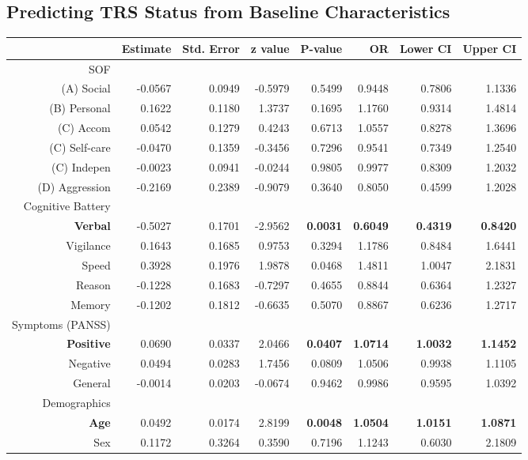\documentclass[a4paper,nobib]{article}
\begin{document}
\subsection*{Predicting TRS Status from Baseline Characteristics}
\begin{table}[!hbtp]
\begin{center}
	\begin{normalsize}
		\begin{tabular}{rrrrrrrr}
\hline
	&Estimate&Std. Error&z value&P-value&OR&Lower CI & Upper CI\\ 
\hline
SOF\\
\hline
(A) Social &-0.0567&0.0949&-0.5979&0.5499&0.9448&0.7806&1.1336\\ 
(B) Personal &0.1622&0.1180&1.3737&0.1695&1.1760&0.9314&1.4814\\ 
(C) Accom &0.0542&0.1279&0.4243&0.6713&1.0557&0.8278&1.3696\\ 
(C) Self-care&-0.0470&0.1359&-0.3456&0.7296&0.9541&0.7349&1.2540\\ 
(C) Indepen &-0.0023&0.0941&-0.0244&0.9805&0.9977&0.8309&1.2032\\ 
(D) Aggression &-0.2169&0.2389&-0.9079&0.3640&0.8050&0.4599&1.2028\\   
\hline
Cognitive Battery\\
\hline
\textbf{Verbal} &-0.5027&0.1701&-2.9562& \textbf{0.0031} & \textbf{0.6049} & \textbf{0.4319} & \textbf{0.8420} \\ 
Vigilance &0.1643&0.1685&0.9753&0.3294&1.1786&0.8484&1.6441\\ 
Speed &0.3928&0.1976&1.9878&0.0468&1.4811&1.0047&2.1831\\ 
Reason &-0.1228&0.1683&-0.7297&0.4655&0.8844&0.6364&1.2327\\ 
Memory &-0.1202&0.1812&-0.6635&0.5070&0.8867&0.6236&1.2717\\  
\hline
Symptoms (PANSS)\\
\hline
\textbf{Positive} &0.0690&0.0337&2.0466& \textbf{0.0407} & \textbf{1.0714} & \textbf{1.0032} & \textbf{1.1452} \\ 
Negative &0.0494&0.0283&1.7456&0.0809&1.0506&0.9938&1.1105\\ 
General &-0.0014&0.0203&-0.0674&0.9462&0.9986&0.9595&1.0392\\  
\hline
Demographics\\
\hline
\textbf{Age} &0.0492&0.0174&2.8199& \textbf{0.0048} & \textbf{1.0504} & \textbf{1.0151} & \textbf{1.0871}\\ 
Sex &0.1172&0.3264&0.3590&0.7196&1.1243&0.6030&2.1809\\ 

\end{tabular}
\end{normalsize}
\end{center}
\end{table}
\end{document}
